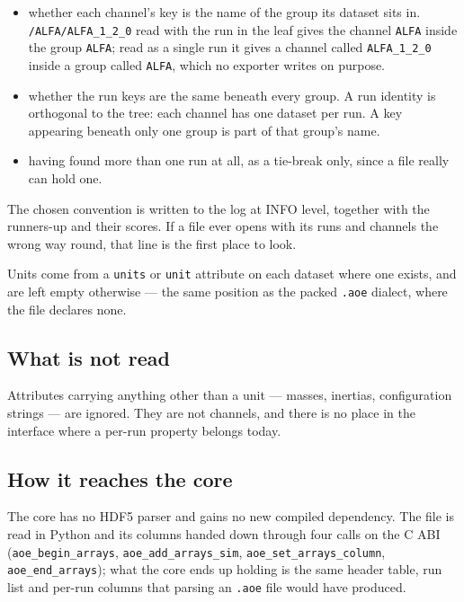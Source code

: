\documentclass[11pt,a4paper,oneside]{report}
\newcommand{\code}[1]{\texttt{#1}}
\begin{document}
\begin{itemize}
  \item whether each channel's key is the name of the group its dataset sits in.
        \code{/ALFA/ALFA\_1\_2\_0} read with the run in the leaf gives the
        channel \code{ALFA} inside the group \code{ALFA}; read as a single run
        it gives a channel called \code{ALFA\_1\_2\_0} inside a group called
        \code{ALFA}, which no exporter writes on purpose.
  \item whether the run keys are the same beneath every group. A run identity is
        orthogonal to the tree: each channel has one dataset per run. A key
        appearing beneath only one group is part of that group's name.
  \item having found more than one run at all, as a tie-break only, since a file
        really can hold one.
\end{itemize}

\begin{aoenote}
The chosen convention is written to the log at INFO level, together with the
runners-up and their scores. If a file ever opens with its runs and channels
the wrong way round, that line is the first place to look.
\end{aoenote}

Units come from a \code{units} or \code{unit} attribute on each dataset where
one exists, and are left empty otherwise --- the same position as the packed
\code{.aoe} dialect, where the file declares none.

\subsection*{What is not read}

Attributes carrying anything other than a unit --- masses, inertias,
configuration strings --- are ignored. They are not channels, and there is no
place in the interface where a per-run property belongs today.

\subsection*{How it reaches the core}

The core has no HDF5 parser and gains no new compiled dependency. The file is
read in Python and its columns handed down through four calls on the C ABI
(\code{aoe\_begin\_arrays}, \code{aoe\_add\_arrays\_sim},
\code{aoe\_set\_arrays\_column}, \code{aoe\_end\_arrays}); what the core ends up
holding is the same header table, run list and per-run columns that parsing an
\code{.aoe} file would have produced.
\end{document}
